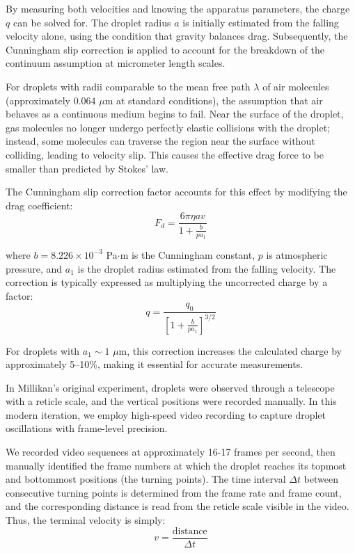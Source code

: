 \documentclass[11pt]{article}
\begin{document}
By measuring both velocities and knowing the apparatus parameters, the charge $q$ can be solved for. The droplet radius $a$ is initially estimated from the falling velocity alone, using the condition that gravity balances drag. Subsequently, the Cunningham slip correction is applied to account for the breakdown of the continuum assumption at micrometer length scales.

For droplets with radii comparable to the mean free path $\lambda$ of air molecules (approximately 0.064 $\mu$m at standard conditions), the assumption that air behaves as a continuous medium begins to fail. Near the surface of the droplet, gas molecules no longer undergo perfectly elastic collisions with the droplet; instead, some molecules can traverse the region near the surface without colliding, leading to velocity slip. This causes the effective drag force to be smaller than predicted by Stokes' law.

The Cunningham slip correction factor accounts for this effect by modifying the drag coefficient:
\begin{equation}
F_d = \frac{6\pi \eta a v}{1 + \frac{b}{p a_1}}
\end{equation}

where $b = 8.226 \times 10^{-3}$ Pa$\cdot$m is the Cunningham constant, $p$ is atmospheric pressure, and $a_1$ is the droplet radius estimated from the falling velocity. The correction is typically expressed as multiplying the uncorrected charge by a factor:
\begin{equation}
q = \frac{q_0}{\left[1 + \frac{b}{p a_1}\right]^{3/2}}
\end{equation}

For droplets with $a_1 \sim 1$ $\mu$m, this correction increases the calculated charge by approximately 5--10\%, making it essential for accurate measurements.

In Millikan's original experiment, droplets were observed through a telescope with a reticle scale, and the vertical positions were recorded manually. In this modern iteration, we employ high-speed video recording to capture droplet oscillations with frame-level precision. 

We recorded video sequences at approximately 16-17 frames per second, then manually identified the frame numbers at which the droplet reaches its topmost and bottommost positions (the turning points). The time interval $\Delta t$ between consecutive turning points is determined from the frame rate and frame count, and the corresponding distance is read from the reticle scale visible in the video. Thus, the terminal velocity is simply:
\begin{equation}
v = \frac{\text{distance}}{\Delta t}
\end{equation}
\end{document}
